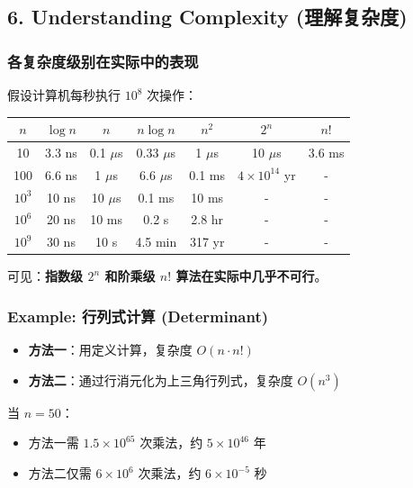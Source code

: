 \documentclass[10pt,a4paper,openany]{ctexbook}
\theoremstyle{definition}
\theoremstyle{remark}
\renewenvironment{quote}
  {\list{}{\leftmargin=1em\rightmargin=0pt\topsep=0.5pt\partopsep=0pt}\item[]}
  {\endlist}
\begin{document}
\subsection{6. Understanding Complexity (理解复杂度)}

\subsubsection{各复杂度级别在实际中的表现}

假设计算机每秒执行 $10^8$ 次操作：
\begin{center}
\begin{tabular}{ccccccc}
\hline
$n$ & $\log n$ & $n$ & $n \log n$ & $n^2$ & $2^n$ & $n!$ \\ \hline
10 & 3.3 ns & 0.1 $\mu$s & 0.33 $\mu$s & 1 $\mu$s & 10 $\mu$s & 3.6 ms \\
100 & 6.6 ns & 1 $\mu$s & 6.6 $\mu$s & 0.1 ms & $4 \times 10^{14}$ yr & - \\
$10^3$ & 10 ns & 10 $\mu$s & 0.1 ms & 10 ms & - & - \\
$10^6$ & 20 ns & 10 ms & 0.2 s & 2.8 hr & - & - \\
$10^9$ & 30 ns & 10 s & 4.5 min & 317 yr & - & - \\
\hline
\end{tabular}

\end{center}

\begin{quote}
可见：\textbf{指数级 $2^n$ 和阶乘级 $n!$ 算法在实际中几乎不可行}。

\end{quote}

\subsubsection{Example: 行列式计算 (Determinant)}

\begin{itemize}
\item \textbf{方法一}：用定义计算，复杂度 $O(n \cdot n!)$
\item \textbf{方法二}：通过行消元化为上三角行列式，复杂度 $O(n^3)$

\end{itemize}

当 $n = 50$：
\begin{itemize}
\item 方法一需 $1.5 \times 10^{65}$ 次乘法，约 $5 \times 10^{46}$ 年
\item 方法二仅需 $6 \times 10^6$ 次乘法，约 $6 \times 10^{-5}$ 秒

\end{itemize}
\end{document}
